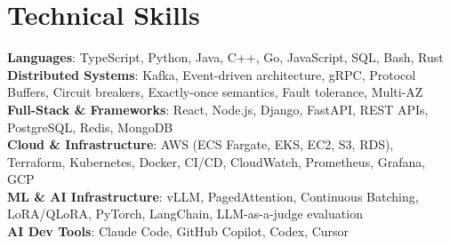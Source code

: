 \documentclass[letterpaper,11pt]{article}
\begin{document}
\section{Technical Skills}
\vspace{-7pt}
\begin{itemize}
[leftmargin=0.15in, label={}]\small{\item{
        \textbf{Languages}{: TypeScript, Python, Java, C++, Go, JavaScript, SQL, Bash, Rust} \\
        \textbf{Distributed Systems}{: Kafka, Event-driven architecture, gRPC, Protocol Buffers, Circuit breakers, Exactly-once semantics, Fault tolerance, Multi-AZ} \\
        \textbf{Full-Stack \& Frameworks}{: React, Node.js, Django, FastAPI, REST APIs, PostgreSQL, Redis, MongoDB} \\
        \textbf{Cloud \& Infrastructure}{: AWS (ECS Fargate, EKS, EC2, S3, RDS), Terraform, Kubernetes, Docker, CI/CD, CloudWatch, Prometheus, Grafana, GCP} \\
        \textbf{ML \& AI Infrastructure}{: vLLM, PagedAttention, Continuous Batching, LoRA/QLoRA, PyTorch, LangChain, LLM-as-a-judge evaluation} \\
        \textbf{AI Dev Tools}{: Claude Code, GitHub Copilot, Codex, Cursor} \\
}}
\end{itemize}
\end{document}
